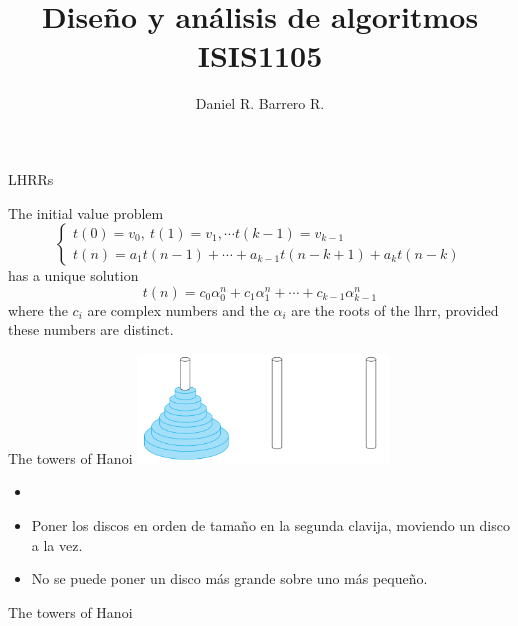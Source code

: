 \documentclass{beamer}
\title{Diseño y análisis de algoritmos \\ ISIS1105}
\author{Daniel R. Barrero R.}
\institute{Universidad de los Andes}
\begin{document}
\frame{\titlepage}

\begin{frame}{LHRRs}
	\begin{thm}[1]\label{thmhr}
		The initial value problem
		\begin{displaymath}
			\begin{cases}
				t(0)= v_0,\ t(1)= v_1,\cdots t(k-1)= v_{k-1}\\
				t(n)= a_1t(n-1) + \cdots + a_{k-1}t(n-k+1) + a_kt(n-k)
			\end{cases}
		\end{displaymath}
		has a unique solution
		\begin{equation*}
			t(n) = c_0\alpha_0^n + c_1\alpha_1^n + \cdots + c_{k-1}\alpha_{k-1}^n
		\end{equation*}
		where the $c_i$ are complex numbers and the $\alpha_i$ are the roots of
		the lhrr, provided these numbers are distinct.
	\end{thm}
\end{frame}

%

\begin{frame}{The towers of Hanoi}
	\includegraphics[width=0.5\textwidth]{hanoi.png}

	\begin{itemize}
		\item[]
		\item Poner los discos en orden de tamaño en la segunda clavija,
			moviendo un disco a la vez.
		\item No se puede poner un disco más grande sobre uno más pequeño.
	\end{itemize}
\end{frame}

%

\begin{frame}{The towers of Hanoi}
	
\end{frame}

%
\end{document}
